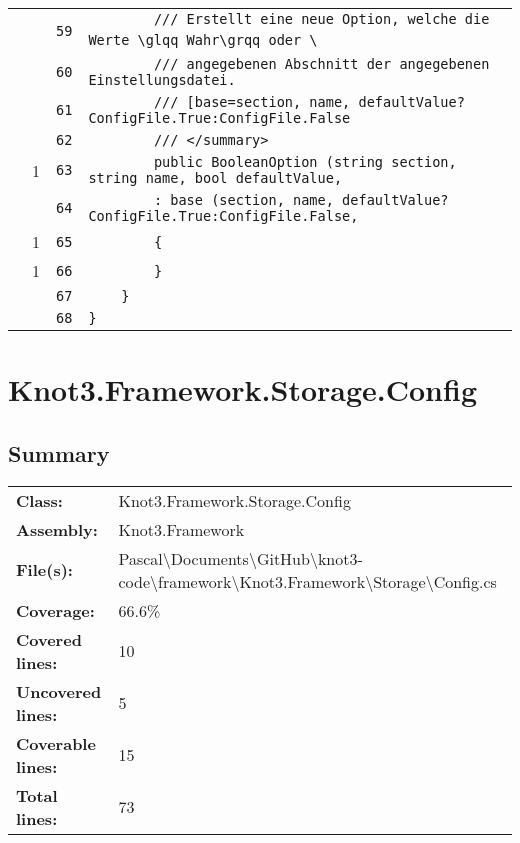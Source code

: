 \documentclass[a4paper,10pt]{article}
\begin{document}
\begin{longtable}[l]{lrrl}
\cellcolor{gray} &  & \verb~59~ & \verb~        /// Erstellt eine neue Option, welche die Werte \glqq Wahr\grqq oder \~\\
\cellcolor{gray} &  & \verb~60~ & \verb~        /// angegebenen Abschnitt der angegebenen Einstellungsdatei.~\\
\cellcolor{gray} &  & \verb~61~ & \verb~        /// [base=section, name, defaultValue?ConfigFile.True:ConfigFile.False~\\
\cellcolor{gray} &  & \verb~62~ & \verb~        /// </summary>~\\
\cellcolor{green} & 1 & \verb~63~ & \verb~        public BooleanOption (string section, string name, bool defaultValue, ~\\
\cellcolor{gray} &  & \verb~64~ & \verb~        : base (section, name, defaultValue?ConfigFile.True:ConfigFile.False, ~\\
\cellcolor{green} & 1 & \verb~65~ & \verb~        {~\\
\cellcolor{green} & 1 & \verb~66~ & \verb~        }~\\
\cellcolor{gray} &  & \verb~67~ & \verb~    }~\\
\cellcolor{gray} &  & \verb~68~ & \verb~}~\\
\end{longtable}
\newpage
\section{Knot3.Framework.Storage.Config}
\subsection{Summary}
\begin{longtable}[l]{ll}
\textbf{Class:} & Knot3.Framework.Storage.Config\\
\textbf{Assembly:} & Knot3.Framework\\
\textbf{File(s):} & \begin{minipage}[t]{12cm}{Pascal\textbackslash Documents\textbackslash GitHub\textbackslash knot3-code\textbackslash framework\textbackslash Knot3.Framework\textbackslash Storage\textbackslash Config.cs}\end{minipage} \\
\textbf{Coverage:} & 66.6\%\\
\textbf{Covered lines:} & 10\\
\textbf{Uncovered lines:} & 5\\
\textbf{Coverable lines:} & 15\\
\textbf{Total lines:} & 73\\
\end{longtable}
\end{document}
